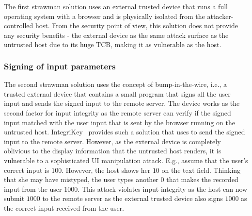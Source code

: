 The first strawman solution uses an external trusted device that runs a full operating system with a browser and is physically isolated from the attacker-controlled host. From the security point of view, this solution does not provide any security benefits - the external device as the same attack surface as the untrusted host due to its huge TCB, making it as vulnerable as the host.

\subsubsection{\bfseries Signing of input parameters}
\label{sec:approach:strawman:2}

The second strawman solution uses the concept of bump-in-the-wire, i.e., a trusted external device that contains a small program that signs all the user input and sends the signed input to the remote server. The device works as the second factor for input integrity as the remote server can verify if the signed input matched with the user input that is sent by the browser running on the untrusted host. IntegriKey~\cite{IntegriKey} provides such a solution that uses \webusb to send the signed input to the remote server. However, as the external device is completely oblivious to the display information that the untrusted host renders, it is vulnerable to a sophisticated UI manipulation attack. E.g., assume that the user's correct input is $100$. However, the host shows her $10$ on the text field. Thinking that she may have mistyped, the user types another $0$ that makes the recorded input from the user $1000$. This attack violates input integrity as the host can now submit $1000$ to the remote server as the external trusted device also signs $1000$ as the correct input received from the user.  


% 

